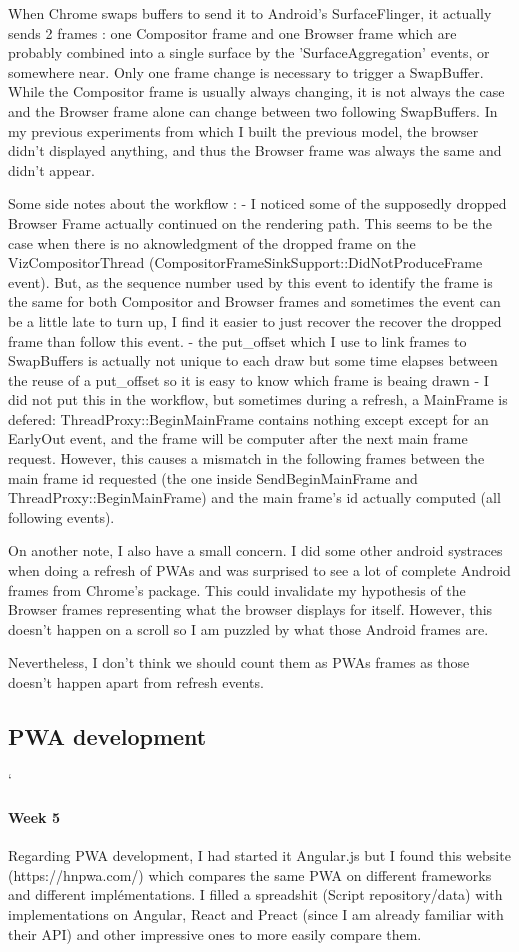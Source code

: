 \documentclass{kththesis}
\begin{document}
When Chrome swaps buffers to send it to Android's SurfaceFlinger, it actually sends 2 frames : one Compositor frame and one Browser frame which are probably combined into a single surface by the 'SurfaceAggregation' events, or somewhere near. Only one frame change is necessary to trigger a SwapBuffer. While the Compositor frame is usually always changing, it is not always the case and the Browser frame alone can change between two following SwapBuffers. In my previous experiments from which I built the previous model, the browser didn't displayed anything, and thus the Browser frame was always the same and didn't appear.

Some side notes about the workflow :
    - I noticed some of the supposedly dropped Browser Frame actually continued on the rendering path. This seems to be the case when there is no aknowledgment of the dropped frame on the VizCompositorThread (CompositorFrameSinkSupport::DidNotProduceFrame event). But, as the sequence number used by this event to identify the frame is the same for both Compositor and Browser frames and sometimes the event can be a little late to turn up, I find it easier to just recover the recover the dropped frame than follow this event. 
    - the put\_offset which I use to link frames to SwapBuffers is actually not unique to each draw but some time elapses between the reuse of a put\_offset so it is easy to know which frame is beaing drawn
    -  I did not put this in the workflow, but sometimes during a refresh, a MainFrame is defered: ThreadProxy::BeginMainFrame contains nothing except except for an EarlyOut event, and the frame will be computer after the next main frame request. However, this causes a mismatch in the following frames between the main frame id requested (the one inside SendBeginMainFrame and ThreadProxy::BeginMainFrame) and the main frame's id actually computed (all following events).


On another note, I also have a small concern. I did some other android systraces when doing a refresh of PWAs and was surprised to see a lot of complete Android frames from Chrome's package. This could invalidate my hypothesis of the Browser frames representing what the browser displays for itself. However, this doesn't happen on a scroll so I am puzzled by what those Android frames are. 

Nevertheless, I don't think we should count them as PWAs frames as those doesn't happen apart from refresh events. 

\subsection{PWA development}
`\paragraph{Week 5}
Regarding PWA development, I had started it Angular.js but I found this website (https://hnpwa.com/) which compares the same PWA on different frameworks and different implémentations. I filled a spreadshit (Script repository/data) with implementations on Angular, React and Preact (since I am already familiar with their API) and other impressive ones to more easily compare them. 
\end{document}

